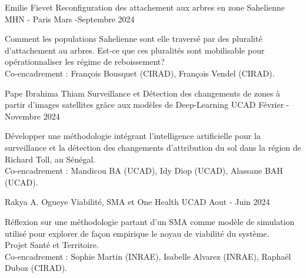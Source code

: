 \vspace{2em}
\vspace{2em}
\begin{cventries}
    \cventry
      {Emilie Fievet} %
      {Reconfiguration des attachement aux arbres en zone Sahelienne} %
      {MHN - Paris} %
      {Mars -Septembre 2024} %
      {
      \begin{cvitems} %
        Comment les populations Sahelienne sont elle traversé par des pluralité d'attachement au arbres. Est-ce que ces pluralités sont mobilisable pour opérationnaliser les régime de reboissement?\\
          Co-encadrement : François Bousquet (CIRAD), François Vendel (CIRAD).
      \end{cvitems}
      }
    \cventry
        {Pape Ibrahima Thiam} %
        {Surveillance et Détection des changements de zones à partir d’images satellites grâce aux modèles de Deep-Learning} %
        {UCAD } %
        {Février - Novembre 2024} %
        {
        \begin{cvitems} %
          Développer une méthodologie intégrant l’intelligence artificielle pour la surveillance et la détection des changements d'attribution du sol dans la région de Richard Toll, au Sénégal.\\
            Co-encadrement : Mandicou BA (UCAD), Idy Diop (UCAD), Alassane BAH (UCAD).
        \end{cvitems}
        }
    \cventry
        {Rakya A. Ogueye} %
        {Viabilité, SMA et One Health} %
        {UCAD } %
        {Aout - Juin 2024} %
        {
        \begin{cvitems} %
            Réflexion sur une méthodologie partant d’un SMA comme modèle de simulation utilisé pour explorer de façon empirique le noyau de viabilité du système.\\
            Projet Santé et Territoire.\\
            Co-encadrement : Sophie Martin (INRAE), Isabelle Alvarez (INRAE), Raphaël Duboz (CIRAD).
        \end{cvitems}
        }


\end{cventries}
